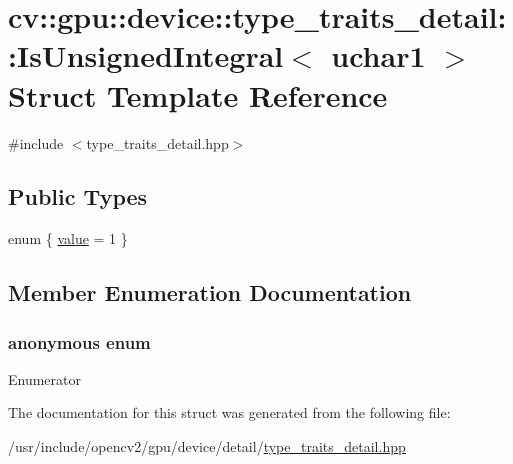 \hypertarget{structcv_1_1gpu_1_1device_1_1type__traits__detail_1_1IsUnsignedIntegral_3_01uchar1_01_4}{\section{cv\-:\-:gpu\-:\-:device\-:\-:type\-\_\-traits\-\_\-detail\-:\-:Is\-Unsigned\-Integral$<$ uchar1 $>$ Struct Template Reference}
\label{structcv_1_1gpu_1_1device_1_1type__traits__detail_1_1IsUnsignedIntegral_3_01uchar1_01_4}
}


{\ttfamily \#include $<$type\-\_\-traits\-\_\-detail.\-hpp$>$}

\subsection*{Public Types}
\begin{DoxyCompactItemize}
\item 
enum \{ \hyperlink{structcv_1_1gpu_1_1device_1_1type__traits__detail_1_1IsUnsignedIntegral_3_01uchar1_01_4_ab04cb3ae786e880f6f17da63383c2ec9af12fbde4d3b72874f017cc296ae67ce8}{value} = 1
 \}
\end{DoxyCompactItemize}


\subsection{Member Enumeration Documentation}
\hypertarget{structcv_1_1gpu_1_1device_1_1type__traits__detail_1_1IsUnsignedIntegral_3_01uchar1_01_4_ab04cb3ae786e880f6f17da63383c2ec9}{\subsubsection[{anonymous enum}]{\setlength{\rightskip}{0pt plus 5cm}anonymous enum}}\label{structcv_1_1gpu_1_1device_1_1type__traits__detail_1_1IsUnsignedIntegral_3_01uchar1_01_4_ab04cb3ae786e880f6f17da63383c2ec9}
\begin{Desc}
\item[Enumerator]\par
\begin{description}
\item[{\em 
\hypertarget{structcv_1_1gpu_1_1device_1_1type__traits__detail_1_1IsUnsignedIntegral_3_01uchar1_01_4_ab04cb3ae786e880f6f17da63383c2ec9af12fbde4d3b72874f017cc296ae67ce8}{value}\label{structcv_1_1gpu_1_1device_1_1type__traits__detail_1_1IsUnsignedIntegral_3_01uchar1_01_4_ab04cb3ae786e880f6f17da63383c2ec9af12fbde4d3b72874f017cc296ae67ce8}
}]\end{description}
\end{Desc}


The documentation for this struct was generated from the following file\-:\begin{DoxyCompactItemize}
\item 
/usr/include/opencv2/gpu/device/detail/\hyperlink{type__traits__detail_8hpp}{type\-\_\-traits\-\_\-detail.\-hpp}\end{DoxyCompactItemize}
